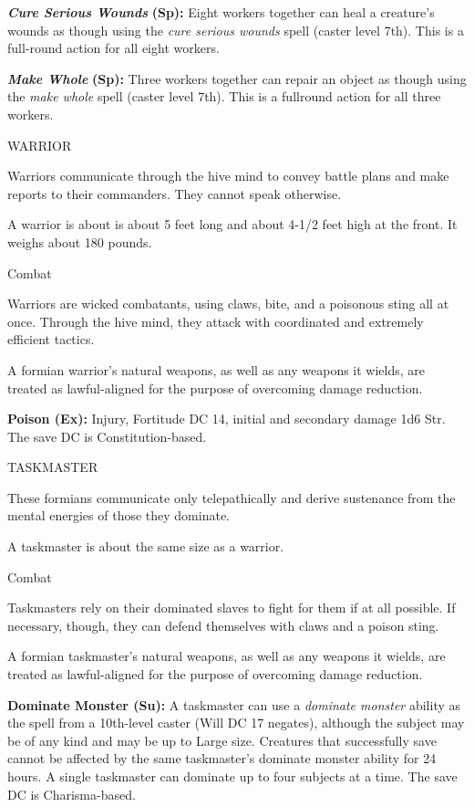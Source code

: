 \documentclass{article}
\begin{document}
\textit{\textbf{Cure Serious Wounds }}\textbf{(Sp):} Eight workers together can 
heal a creature's wounds as though using the \textit{cure serious wounds }spell 
(caster level 7th). This is a full-round action for all eight workers.

\textit{\textbf{Make Whole }}\textbf{(Sp):} Three workers together can repair an 
object as though using the \textit{make whole }spell (caster level 7th). This is 
a fullround action for all three workers.

WARRIOR

Warriors communicate through the hive mind to convey battle plans and make reports 
to their commanders. They cannot speak otherwise.

A warrior is about is about 5 feet long and about 4-1/2 feet high at the front. 
It weighs about 180 pounds.

Combat

Warriors are wicked combatants, using claws, bite, and a poisonous sting all at 
once. Through the hive mind, they attack with coordinated and extremely efficient 
tactics.

A formian warrior's natural weapons, as well as any weapons it wields, are treated 
as lawful-aligned for the purpose of overcoming damage reduction.

\textbf{Poison (Ex):} Injury, Fortitude DC 14, initial and secondary damage 1d6 
Str. The save DC is Constitution-based.

TASKMASTER

These formians communicate only telepathically and derive sustenance from the mental 
energies of those they dominate.

A taskmaster is about the same size as a warrior.

Combat

Taskmasters rely on their dominated slaves to fight for them if at all possible. 
If necessary, though, they can defend themselves with claws and a poison sting.

A formian taskmaster's natural weapons, as well as any weapons it wields, are treated 
as lawful-aligned for the purpose of overcoming damage reduction.

\textbf{Dominate Monster (Su):} A taskmaster can use a \textit{dominate monster 
}ability as the spell from a 10th-level caster (Will DC 17 negates), although the 
subject may be of any kind and may be up to Large size. Creatures that successfully 
save cannot be affected by the same taskmaster's dominate monster ability for 24 
hours. A single taskmaster can dominate up to four subjects at a time. The save 
DC is Charisma-based.
\end{document}
